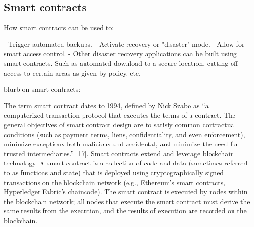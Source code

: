 
\subsection{Smart contracts}

How smart contracts can be used to:

 - Trigger automated backups.
 - Activate recovery or "disaster" mode.
 - Allow for smart access control.
 - Other disaster recovery applications can be 
 built using smart contracts. Such as automated download
 to a secure location, cutting off access to certain areas
 as given by policy, etc.

 blurb on smart contracts: 

 The term smart contract dates to 1994, defined by Nick Szabo as “a computerized transaction
protocol that executes the terms of a contract. The general objectives of smart contract design are
to satisfy common contractual conditions (such as payment terms, liens, confidentiality, and even
enforcement), minimize exceptions both malicious and accidental, and minimize the need for
trusted intermediaries.” [17].
Smart contracts extend and leverage blockchain technology. A smart contract is a collection of
code and data (sometimes referred to as functions and state) that is deployed using
cryptographically signed transactions on the blockchain network (e.g., Ethereum’s smart
contracts, Hyperledger Fabric’s chaincode). The smart contract is executed by nodes within the
blockchain network; all nodes that execute the smart contract must derive the same results from
the execution, and the results of execution are recorded on the blockchain.
